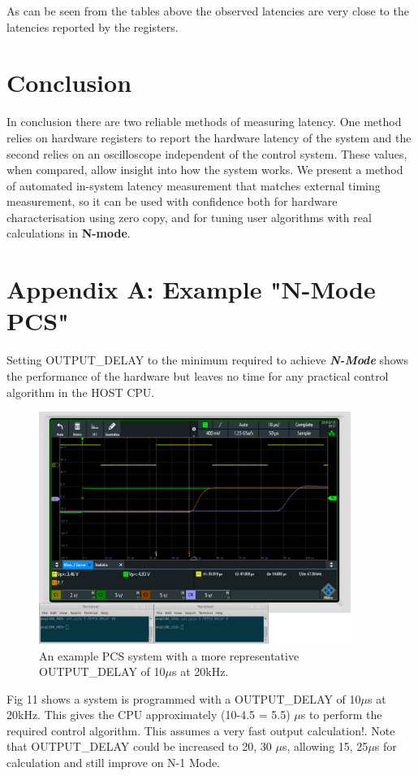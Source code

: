 \documentclass{article}
\begin{document}
As can be seen from the tables above the observed latencies are very close to the latencies reported by the registers.

\section{Conclusion}
In conclusion there are two reliable methods of measuring latency.
One method relies on hardware registers to report the hardware latency of the system and the second relies on an oscilloscope independent of the control system.
These values, when compared, allow insight into how the system works.
We present a method of automated in-system latency measurement that matches external timing measurement, so it can be used with confidence both for hardware characterisation using zero copy, and for tuning user algorithms with real calculations in \textbf{N-mode}.

\section{Appendix A: Example "N-Mode PCS"}

Setting OUTPUT\_DELAY to the minimum required to achieve \textit{\textbf{N-Mode}} shows the performance of the hardware but leaves no time for any practical control algorithm in the HOST CPU.

\begin{figure}
	\centering
	\includegraphics[width=4.0in]{images/n-mode-pcs-scope-trace-20kHz.png}
	\caption{An example PCS system with a more representative OUTPUT\_DELAY of 10$\mu$s at 20kHz.}
	\label{20repscope}
\end{figure}

Fig 11 shows a system is programmed with a OUTPUT\_DELAY of 10$\mu$s at 20kHz.
This gives the CPU approximately (10-4.5 = 5.5) $\mu$s to perform the required control algorithm.
This assumes a very fast output calculation!.
Note that OUTPUT\_DELAY could be increased to 20, 30 $\mu$s, allowing 15, 25$\mu$s for calculation and still improve on N-1 Mode.
\end{document}
